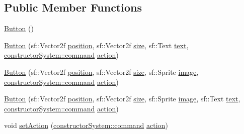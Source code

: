 \subsection*{Public Member Functions}
\begin{DoxyCompactItemize}
\item 
\hyperlink{classant_1_1_g_u_i_1_1_button_ae83247d09ff797353c3e15feda804ec9}{Button} ()
\item 
\hyperlink{classant_1_1_g_u_i_1_1_button_a7bfb2d684add8ea2d8b862b95da4806f}{Button} (sf\+::\+Vector2f \hyperlink{classant_1_1_g_u_i_1_1_button_a68b670cec9ef8de0bb26bf67bb0313f5}{position}, sf\+::\+Vector2f \hyperlink{classant_1_1_g_u_i_1_1_button_a6c6e3fddc805d48d43990ba533aeb01d}{size}, sf\+::\+Text \hyperlink{classant_1_1_g_u_i_1_1_button_a1b7b25b11fa7522434fe6d9d5ac79d95}{text}, \hyperlink{classant_1_1constructor_system_a0977052dc8865f8e79ae03b4f3e18d8a}{constructor\+System\+::command} \hyperlink{classant_1_1_g_u_i_1_1_button_adc6b1ff378eeb0583164c6fbacce483d}{action})
\item 
\hyperlink{classant_1_1_g_u_i_1_1_button_ae4fc6ea16f464bbce9fc27e606ed341e}{Button} (sf\+::\+Vector2f \hyperlink{classant_1_1_g_u_i_1_1_button_a68b670cec9ef8de0bb26bf67bb0313f5}{position}, sf\+::\+Vector2f \hyperlink{classant_1_1_g_u_i_1_1_button_a6c6e3fddc805d48d43990ba533aeb01d}{size}, sf\+::\+Sprite \hyperlink{classant_1_1_g_u_i_1_1_button_a25b63a495b3ca48c5384a6304401a14c}{image}, \hyperlink{classant_1_1constructor_system_a0977052dc8865f8e79ae03b4f3e18d8a}{constructor\+System\+::command} \hyperlink{classant_1_1_g_u_i_1_1_button_adc6b1ff378eeb0583164c6fbacce483d}{action})
\item 
\hyperlink{classant_1_1_g_u_i_1_1_button_ab19f9be2523cd5375265a13b5585b0ee}{Button} (sf\+::\+Vector2f \hyperlink{classant_1_1_g_u_i_1_1_button_a68b670cec9ef8de0bb26bf67bb0313f5}{position}, sf\+::\+Vector2f \hyperlink{classant_1_1_g_u_i_1_1_button_a6c6e3fddc805d48d43990ba533aeb01d}{size}, sf\+::\+Sprite \hyperlink{classant_1_1_g_u_i_1_1_button_a25b63a495b3ca48c5384a6304401a14c}{image}, sf\+::\+Text \hyperlink{classant_1_1_g_u_i_1_1_button_a1b7b25b11fa7522434fe6d9d5ac79d95}{text}, \hyperlink{classant_1_1constructor_system_a0977052dc8865f8e79ae03b4f3e18d8a}{constructor\+System\+::command} \hyperlink{classant_1_1_g_u_i_1_1_button_adc6b1ff378eeb0583164c6fbacce483d}{action})
\item 
void \hyperlink{classant_1_1_g_u_i_1_1_button_a47939d83d9cdfd61f4fb9bf0636997e4}{set\+Action} (\hyperlink{classant_1_1constructor_system_a0977052dc8865f8e79ae03b4f3e18d8a}{constructor\+System\+::command} \hyperlink{classant_1_1_g_u_i_1_1_button_adc6b1ff378eeb0583164c6fbacce483d}{action})

\end{DoxyCompactItemize}
